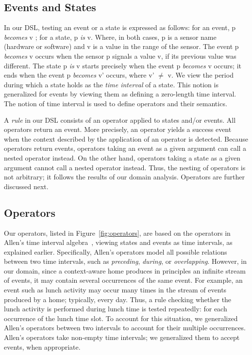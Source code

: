  

\subsection{Events and States}
In our DSL, testing an event or a state is expressed as follows: for an event, {\ttfamily p {\em becomes} v} ; for a state, {\ttfamily p {\em is} v}. Where, in both cases, {\ttfamily p} is a sensor name (hardware or software) and {\ttfamily v} is a value in the range of the sensor.  The event {\ttfamily p {\em becomes} v} occurs when the sensor {\ttfamily p} signals a value {\ttfamily v}, if its previous value was different. The state {\ttfamily p {\em is} v} starts precisely when the event {\ttfamily p {\em becomes} v} occurs; it ends when the event {\ttfamily p {\em becomes} v'} occurs, where {\ttfamily v'} $\neq$ {\ttfamily v}. We view the period during which a state holds as the {\em time interval} of a state. This notion is generalized for events by viewing them as defining a zero-length time interval. The notion of time interval is used to define operators and their semantics.

A {\em rule} in our DSL consists of an operator applied to states and/or events. All operators return an event.
More precisely, an operator yields a success event when the context described by the application of an operator is detected. 
Because operators return events, operators taking an event as a given argument can call a nested operator instead.
On the other hand, operators taking a state as a given argument cannot call a nested operator instead.
Thus, the nesting of operators is not arbitrary; it follows the results of our domain analysis. Operators are further discussed next.

\subsection{Operators}
Our operators, listed in Figure~\ref{fig:operators}, are based on the operators in Allen's time interval algebra~\cite{Allen}, viewing states and events as time intervals, as explained earlier. Specifically, Allen's operators model all possible relations between two time intervals, such as {\em preceding}, {\em during}, or {\em overlapping}. However, in our domain, since a context-aware home produces in principles an infinite stream of events, it may contain several occurrences of the same event. For example, an event such as lunch activity may occur many times in the stream of events produced by a home; typically, every day. Thus, a rule checking whether the lunch activity is performed during lunch time is tested repeatedly: for each occurrence of the lunch time slot. To account for this situation, we generalized Allen's operators between two intervals to account for their multiple occurrences. Allen's operators take non-empty time intervals; we generalized them to accept events, when appropriate.


